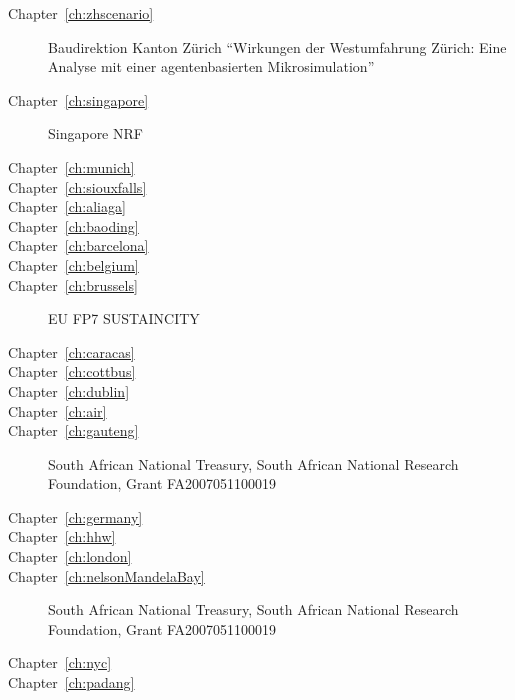 \begin{description}
\item[Chapter~\ref{ch:zhscenario}]  Baudirektion Kanton Zürich ``Wirkungen der Westumfahrung Zürich: Eine Analyse mit einer agentenbasierten Mikrosimulation''

\item[Chapter~\ref{ch:singapore}]  Singapore NRF 

\item[Chapter~\ref{ch:munich}]  

\item[Chapter~\ref{ch:siouxfalls}]  

\item[Chapter~\ref{ch:aliaga}]  

\item[Chapter~\ref{ch:baoding}]  

\item[Chapter~\ref{ch:barcelona}]  

\item[Chapter~\ref{ch:belgium}]  

\item[Chapter~\ref{ch:brussels}]  EU FP7 SUSTAINCITY 

\item[Chapter~\ref{ch:caracas}]  

\item[Chapter~\ref{ch:cottbus}]  

\item[Chapter~\ref{ch:dublin}]  

\item[Chapter~\ref{ch:air}]  

\item[Chapter~\ref{ch:gauteng}] South African National Treasury, South African National Research Foundation, Grant FA2007051100019

\item[Chapter~\ref{ch:germany}]  

\item[Chapter~\ref{ch:hhw}]  

\item[Chapter~\ref{ch:london}]  

\item[Chapter~\ref{ch:nelsonMandelaBay}] South African National Treasury, South African National Research Foundation, Grant FA2007051100019 

\item[Chapter~\ref{ch:nyc}]  

\item[Chapter~\ref{ch:padang}]  


\end{description}
